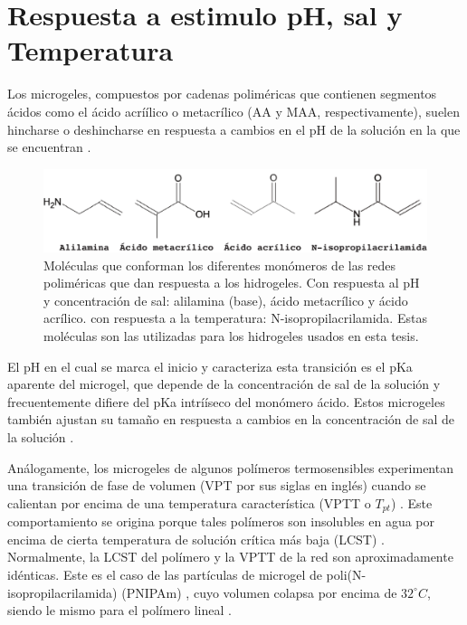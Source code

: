 \section{Respuesta a estimulo pH, sal y Temperatura}

Los microgeles, compuestos por cadenas polim\'ericas que contienen segmentos \'acidos como el \'acido acrí\'ilico o metacr\'ilico (AA y MAA, respectivamente), suelen hincharse o deshincharse en respuesta a cambios en el pH de la soluci\'on en la que se encuentran  \cite{snowden1996colloidal}.

\begin{figure}[!tb]
	\centering
	\includegraphics[width=0.9\linewidth]{Figures/modelos/acidos.pdf}
	\caption{Mol\'eculas  que conforman los diferentes mon\'omeros de las redes polim\'ericas que dan respuesta a los hidrogeles. Con respuesta al pH y concentraci\'on de sal: alilamina (base),  \'acido metacr\'ilico y \'acido acr\'ilico. con respuesta a la temperatura: N-isopropilacrilamida.
	Estas mol\'eculas son las utilizadas para los hidrogeles usados en esta tesis.}
	\label{fig:intro:acidos-aa-maa}
\end{figure}


El pH en el cual se marca el inicio y caracteriza esta transici\'on es el pKa aparente del microgel, que depende de la concentraci\'on de sal de la soluci\'on y frecuentemente difiere del pKa intrí\'iseco del mon\'omero \'acido.
Estos microgeles tambi\'en ajustan su tama\~no en respuesta a cambios en la concentraci\'on de sal de la soluci\'on \cite{snowden1996colloidal}.
	
An\'alogamente, los microgeles de algunos pol\'imeros termosensibles experimentan una transici\'on de fase de volumen (VPT por sus siglas en ingl\'es) cuando se calientan por encima de una temperatura caracter\'istica (VPTT o $T_{pt}$) \cite{Pelton1986,Pelton2000}.
Este comportamiento se origina porque tales pol\'imeros son insolubles en agua por encima de cierta temperatura de soluci\'on cr\'itica m\'as baja (LCST) \cite{Kawaguchi2020}.
Normalmente, la LCST del pol\'imero y la VPTT de la red  son aproximadamente id\'enticas. 
Este es el caso de las part\'iculas de microgel de poli(N-isopropilacrilamida) (PNIPAm) \cite{Pelton1986}, cuyo volumen colapsa por encima de $32   ^\circ C$, siendo le mismo para el  pol\'imero lineal \cite{Schild1992}.
	

